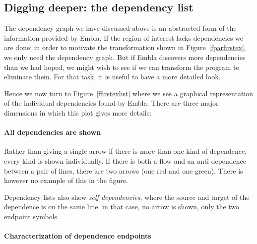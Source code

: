 \subsection{Digging deeper: the dependency list}

The dependency graph we have discussed above is an abstracted form of
the information provided by Embla. If the region of interest lacks
dependencies we are done; in order to motivate the transformation
shown in Figure~\ref{fparfirstex}, we only need the dependency
graph. But if Embla discovers more dependencies than we had hoped, we
might wish to see if we can transform the program to eliminate them.
For that task, it is useful to have a more detailed look.

Hence we now turn to Figure~\ref{ffirstexlist} where we see a
graphical representation of the individual dependencies found by
Embla. There are three major dimensions in which this plot gives more
details:

\paragraph*{All dependencies are shown} 

Rather than giving a single arrow if there is more than one kind of
dependence, every kind is shown individually. If there is both a flow
and an anti dependence between a pair of lines, there are two arrows
(one red and one green). There is however no example of this in the
figure.

Dependency lists also show {\em self dependencies}, where the source
and target of the dependence is on the same line. in that case, no
arrow is shown, only the two endpoint symbols. 

\paragraph*{Characterization of dependence endpoints}

